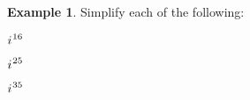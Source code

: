 \documentclass[addpoints,12pt]{exam}
\theoremstyle{definition}
\newtheorem{example}{Example}[subsection]
\newcommand{\iu}{{i\mkern1mu}}
\begin{document}
\vspace{.15in}

\begin{example}
Simplify each of the following:
\begin{enumerate}
\begin{minipage}{.3\textwidth}
\item $\iu^{16}$
\end{minipage}%
\begin{minipage}{.3\textwidth}
\item $\iu^{25}$
\end{minipage}%
\begin{minipage}{.3\textwidth}
\item $\iu^{35}$
\end{minipage}%
\end{enumerate}
\end{example}
\end{document}
